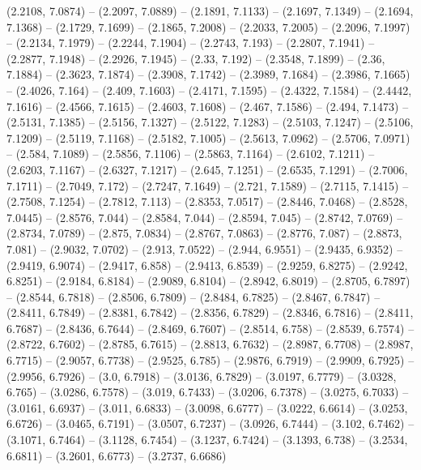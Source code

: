 {  (2.2108, 7.0874) -- (2.2097, 7.0889) -- (2.1891, 7.1133) -- (2.1697, 7.1349) 
  -- (2.1694, 7.1368) -- (2.1729, 7.1699) -- (2.1865, 7.2008) -- (2.2033, 
  7.2005) -- (2.2096, 7.1997) -- (2.2134, 7.1979) -- (2.2244, 7.1904) -- 
  (2.2743, 7.193) -- (2.2807, 7.1941) -- (2.2877, 7.1948) -- (2.2926, 7.1945) --
   (2.33, 7.192) -- (2.3548, 7.1899) -- (2.36, 7.1884) -- (2.3623, 7.1874) -- 
  (2.3908, 7.1742) -- (2.3989, 7.1684) -- (2.3986, 7.1665) -- (2.4026, 7.164) --
   (2.409, 7.1603) -- (2.4171, 7.1595) -- (2.4322, 7.1584) -- (2.4442, 7.1616) 
  -- (2.4566, 7.1615) -- (2.4603, 7.1608) -- (2.467, 7.1586) -- (2.494, 7.1473) 
  -- (2.5131, 7.1385) -- (2.5156, 7.1327) -- (2.5122, 7.1283) -- (2.5103, 
  7.1247) -- (2.5106, 7.1209) -- (2.5119, 7.1168) -- (2.5182, 7.1005) -- 
  (2.5613, 7.0962) -- (2.5706, 7.0971) -- (2.584, 7.1089) -- (2.5856, 7.1106) --
   (2.5863, 7.1164) -- (2.6102, 7.1211) -- (2.6203, 7.1167) -- (2.6327, 7.1217) 
  -- (2.645, 7.1251) -- (2.6535, 7.1291) -- (2.7006, 7.1711) -- (2.7049, 7.172) 
  -- (2.7247, 7.1649) -- (2.721, 7.1589) -- (2.7115, 7.1415) -- (2.7508, 7.1254)
   -- (2.7812, 7.113) -- (2.8353, 7.0517) -- (2.8446, 7.0468) -- (2.8528, 
  7.0445) -- (2.8576, 7.044) -- (2.8584, 7.044) -- (2.8594, 7.045) -- (2.8742, 
  7.0769) -- (2.8734, 7.0789) -- (2.875, 7.0834) -- (2.8767, 7.0863) -- (2.8776,
   7.087) -- (2.8873, 7.081) -- (2.9032, 7.0702) -- (2.913, 7.0522) -- (2.944, 
  6.9551) -- (2.9435, 6.9352) -- (2.9419, 6.9074) -- (2.9417, 6.858) -- (2.9413,
   6.8539) -- (2.9259, 6.8275) -- (2.9242, 6.8251) -- (2.9184, 6.8184) -- 
  (2.9089, 6.8104) -- (2.8942, 6.8019) -- (2.8705, 6.7897) -- (2.8544, 6.7818) 
  -- (2.8506, 6.7809) -- (2.8484, 6.7825) -- (2.8467, 6.7847) -- (2.8411, 
  6.7849) -- (2.8381, 6.7842) -- (2.8356, 6.7829) -- (2.8346, 6.7816) -- 
  (2.8411, 6.7687) -- (2.8436, 6.7644) -- (2.8469, 6.7607) -- (2.8514, 6.758) --
   (2.8539, 6.7574) -- (2.8722, 6.7602) -- (2.8785, 6.7615) -- (2.8813, 6.7632) 
  -- (2.8987, 6.7708) -- (2.8987, 6.7715) -- (2.9057, 6.7738) -- (2.9525, 6.785)
   -- (2.9876, 6.7919) -- (2.9909, 6.7925) -- (2.9956, 6.7926) -- (3.0, 6.7918) 
  -- (3.0136, 6.7829) -- (3.0197, 6.7779) -- (3.0328, 6.765) -- (3.0286, 6.7578)
   -- (3.019, 6.7433) -- (3.0206, 6.7378) -- (3.0275, 6.7033) -- (3.0161, 
  6.6937) -- (3.011, 6.6833) -- (3.0098, 6.6777) -- (3.0222, 6.6614) -- (3.0253,
   6.6726) -- (3.0465, 6.7191) -- (3.0507, 6.7237) -- (3.0926, 6.7444) -- 
  (3.102, 6.7462) -- (3.1071, 6.7464) -- (3.1128, 6.7454) -- (3.1237, 6.7424) --
   (3.1393, 6.738) -- (3.2534, 6.6811) -- (3.2601, 6.6773) -- (3.2737, 6.6686) 
}
